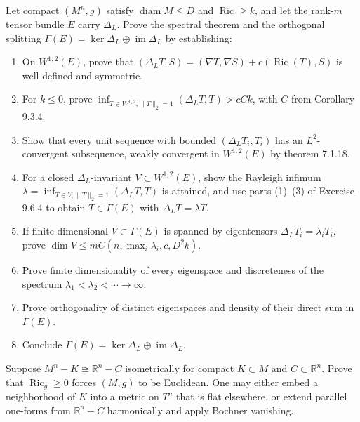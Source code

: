 \begin{remark}
  \label{rem:pet-ch9-exercise-9-6-5}

  Let compact $(M^n,g)$ satisfy $\operatorname{diam}M\le D$ and
  $\operatorname{Ric}\ge k$, and let the rank-$m$ tensor bundle $E$ carry
  $\Delta_L$.  Prove the spectral theorem and the orthogonal splitting
  $\Gamma(E)=\ker\Delta_L\oplus\operatorname{im}\Delta_L$ by establishing:
  \begin{enumerate}
    \item[(1)] On $W^{1,2}(E)$, prove that
      $(\Delta_LT,S)=(\nabla T,\nabla S)+c(\operatorname{Ric}(T),S)$ is
      well-defined and symmetric.
    \item[(2)] For $k\le0$, prove
      $\inf_{T\in W^{1,2},\|T\|_2=1}(\Delta_LT,T)>cCk$, with $C$ from
      Corollary 9.3.4.
    \item[(3)] Show that every unit sequence with bounded
      $(\Delta_LT_i,T_i)$ has an $L^2$-convergent subsequence, weakly convergent
      in $W^{1,2}(E)$ by theorem 7.1.18.
    \item[(4)] For a closed $\Delta_L$-invariant
      $V\subset W^{1,2}(E)$, show the Rayleigh infimum
      $\lambda=\inf_{T\in V,\|T\|_2=1}(\Delta_LT,T)$ is attained, and use
      parts (1)--(3) of Exercise 9.6.4 to obtain
      $T\in\Gamma(E)$ with $\Delta_LT=\lambda T$.
    \item[(5)] If finite-dimensional $V\subset\Gamma(E)$ is spanned by
      eigentensors $\Delta_LT_i=\lambda_iT_i$, prove
      $\dim V\le mC(n,\max_i\lambda_i,c,D^2k)$.
    \item[(6)] Prove finite dimensionality of every eigenspace and discreteness
      of the spectrum $\lambda_1<\lambda_2<\cdots\to\infty$.
    \item[(7)] Prove orthogonality of distinct eigenspaces and density of their
      direct sum in $\Gamma(E)$.
    \item[(8)] Conclude $\Gamma(E)=\ker\Delta_L\oplus\operatorname{im}\Delta_L$.
  \end{enumerate}
\end{remark}

\begin{remark}
  \label{rem:pet-ch9-exercise-9-6-6}

  Suppose $M^n-K\cong\mathbb R^n-C$ isometrically for compact
  $K\subset M$ and $C\subset\mathbb R^n$.  Prove that
  $\operatorname{Ric}_g\ge0$ forces $(M,g)$ to be Euclidean.  One may either
  embed a neighborhood of $K$ into a metric on $T^n$ that is flat elsewhere,
  or extend parallel one-forms from $\mathbb R^n-C$ harmonically and apply
  Bochner vanishing.
\end{remark}

